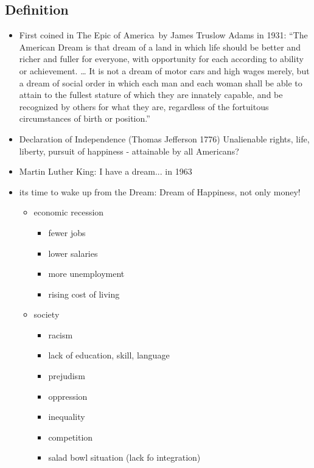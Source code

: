 \documentclass[a5paper,12pt,twoside,titlepage]{scrartcl}
\begin{document}
	\subsection{Definition}
	\begin{itemize}
	\item First coined in \glqq The Epic of America\grqq\ by James Truslow Adams in 1931: “The American Dream is that dream of a land in which life should be better and richer and fuller for everyone, with opportunity for each according to ability or achievement. 
	… It is not a dream of motor cars and high wages merely, but a dream of social order in which each man and each woman shall be able to attain to the fullest stature of which they are innately capable, and be recognized by others for what they are, regardless of the fortuitous circumstances of birth or position.” 

			\item \textrightarrow Declaration of Independence (Thomas Jefferson 1776) Unalienable rights, life, liberty, pursuit of happiness - attainable by all Americans?
			\item Martin Luther King: I have a dream... in 1963
			\item \glqq its time to wake up from the Dream: \grqq 
			\subitem Dream of Happiness, not only money!
				\begin{itemize}
					\item economic recession
					\begin{itemize}
						\item fewer jobs
						\item lower salaries
						\item more unemployment
						\item rising cost of living
					\end{itemize}
					\item society
					\begin{itemize}
						\item racism
						\item lack of education, skill, language
						\item prejudism
						\item oppression
						\item inequality
						\item competition
						\item salad bowl situation (lack fo integration)
					\end{itemize}
				\end{itemize}
		\end{itemize}
\end{document}
